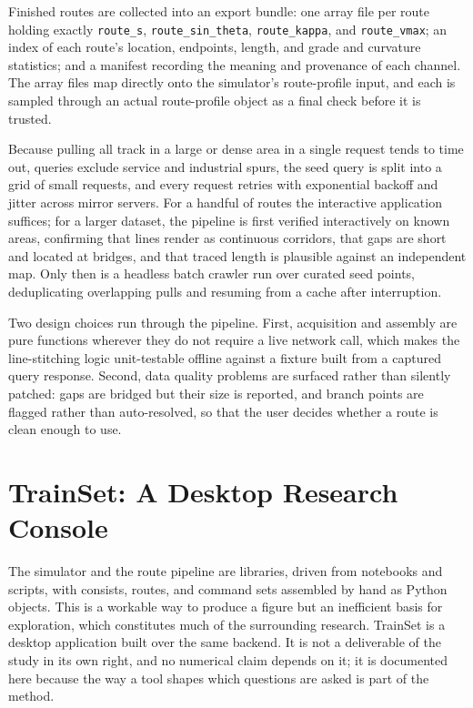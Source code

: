 \documentclass[numbered]{trbunofficial}
\begin{document}
Finished routes are collected into an export bundle: one array file per route holding exactly \texttt{route\_s}, \texttt{route\_sin\_theta}, \texttt{route\_kappa}, and \texttt{route\_vmax}; an index of each route's location, endpoints, length, and grade and curvature statistics; and a manifest recording the meaning and provenance of each channel. The array files map directly onto the simulator's route-profile input, and each is sampled through an actual route-profile object as a final check before it is trusted.

Because pulling all track in a large or dense area in a single request tends to time out, queries exclude service and industrial spurs, the seed query is split into a grid of small requests, and every request retries with exponential backoff and jitter across mirror servers. For a handful of routes the interactive application suffices; for a larger dataset, the pipeline is first verified interactively on known areas, confirming that lines render as continuous corridors, that gaps are short and located at bridges, and that traced length is plausible against an independent map. Only then is a headless batch crawler run over curated seed points, deduplicating overlapping pulls and resuming from a cache after interruption.

Two design choices run through the pipeline. First, acquisition and assembly are pure functions wherever they do not require a live network call, which makes the line-stitching logic unit-testable offline against a fixture built from a captured query response. Second, data quality problems are surfaced rather than silently patched: gaps are bridged but their size is reported, and branch points are flagged rather than auto-resolved, so that the user decides whether a route is clean enough to use.

\section{TrainSet: A Desktop Research Console}\label{sec:trainset}

The simulator and the route pipeline are libraries, driven from notebooks and scripts, with consists, routes, and command sets assembled by hand as Python objects. This is a workable way to produce a figure but an inefficient basis for exploration, which constitutes much of the surrounding research. TrainSet is a desktop application built over the same backend. It is not a deliverable of the study in its own right, and no numerical claim depends on it; it is documented here because the way a tool shapes which questions are asked is part of the method.
\end{document}
